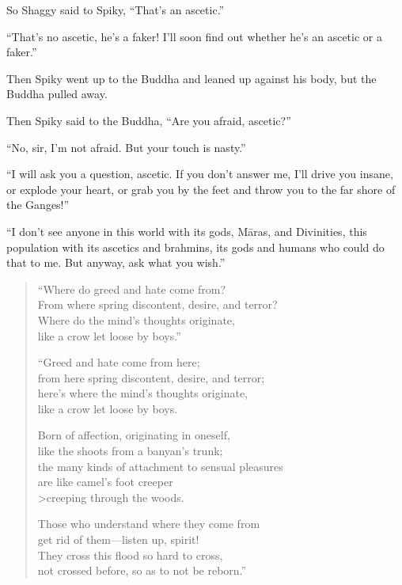 \documentclass[12pt,openany]{book}%
\begin{document}
So Shaggy said to Spiky, “That’s an ascetic.” 

“That’s no ascetic, he’s a faker! I’ll soon find out whether he’s an ascetic or a faker.” 

Then Spiky went up to the Buddha and leaned up against his body, but the Buddha pulled away. 

Then Spiky said to the Buddha, “Are you afraid, ascetic?” 

“No, sir, I’m not afraid. But your touch is nasty.” 

“I will ask you a question, ascetic. If you don’t answer me, I’ll drive you insane, or explode your heart, or grab you by the feet and throw you to the far shore of the Ganges!” 

“I don’t see anyone in this world with its gods, \textsanskrit{Māras}, and Divinities, this population with its ascetics and brahmins, its gods and humans who could do that to me. But anyway, ask what you wish.” 

\begin{verse}%
“Where do greed and hate come from? \\
From where spring discontent, desire, and terror? \\
Where do the mind’s thoughts originate, \\
like a crow let loose by boys.” 

“Greed and hate come from here; \\
from here spring discontent, desire, and terror; \\
here’s where the mind’s thoughts originate, \\
like a crow let loose by boys. 

Born of affection, originating in oneself, \\
like the shoots from a banyan’s trunk; \\
the many kinds of attachment to sensual pleasures \\
are like camel’s foot creeper \\>creeping through the woods. 

Those who understand where they come from \\
get rid of them—listen up, spirit! \\
They cross this flood so hard to cross, \\
not crossed before, so as to not be reborn.” 

%
\end{verse}
\end{document}
